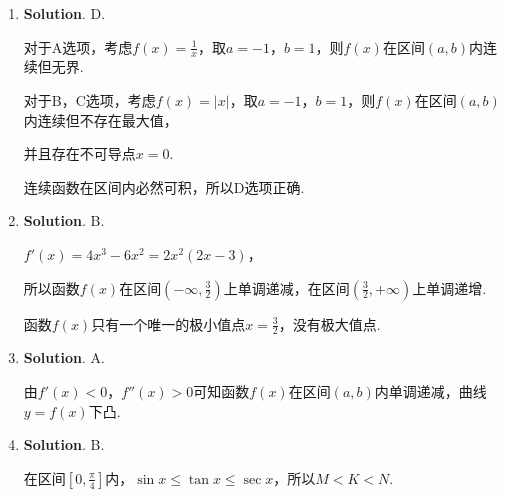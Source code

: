 \documentclass[../Main.tex]{subfiles}
\begin{document}
\begin{enumerate}
    \item \textbf{Solution}. D.

          对于A选项，考虑$f(x)=\frac{1}{x}$，取$a=-1$，$b=1$，则$f(x)$在区间$(a,b)$内连续但无界.

          对于B，C选项，考虑$f(x)=|x|$，取$a=-1$，$b=1$，则$f(x)$在区间$(a,b)$内连续但不存在最大值，

          并且存在不可导点$x=0$.

          连续函数在区间内必然可积，所以D选项正确.

    \item \textbf{Solution}. B.

          $f'(x)=4x^{3}-6x^{2}=2x^{2}(2x-3)$，

          所以函数$f(x)$在区间$\left(-\infty,\frac{3}{2}\right)$上单调递减，在区间$\left
              (\frac{3}{2},+\infty\right)$上单调递增.

          函数$f(x)$只有一个唯一的极小值点$x=\frac{3}{2}$，没有极大值点.

    \item \textbf{Solution}. A.

          由$f'(x)<0$，$f''(x)>0$可知函数$f(x)$在区间$(a,b)$内单调递减，曲线$y=f(x)$下凸.

    \item \textbf{Solution}. B.

          在区间$\left[0,\frac{\pi}{4}\right]$内，$\sin x\leq \tan x\leq \sec x$，所以$M<K<N$.
\end{enumerate}
\end{document}
